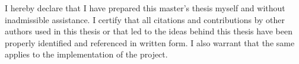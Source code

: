 I hereby declare that I have prepared this master's thesis myself and without inadmissible assistance. I certify that all citations and contributions by other authors used in this thesis or that led to the ideas behind this thesis have been properly identified and referenced in written form. I also warrant that the same applies to the implementation of the project.
